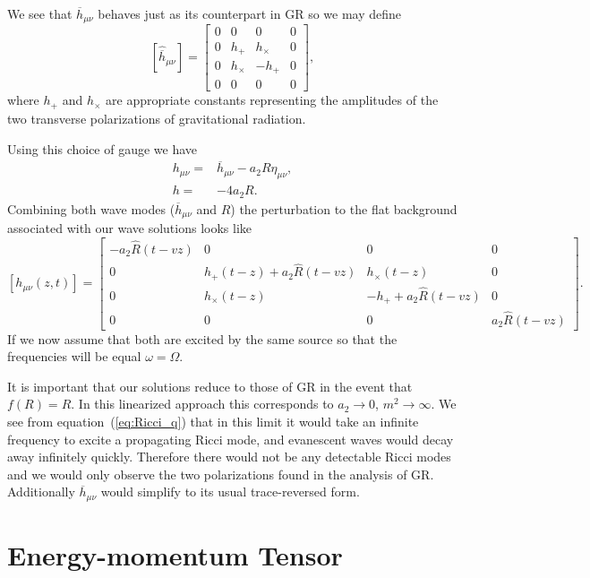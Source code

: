 \documentclass[a4paper, 11pt, titlepage, twoside]{report}
\newcommand{\eqnref}[1]{equation~(\ref{eq:#1})}
\begin{document}
We see that $\overline{h}_{\mu\nu}$ behaves just as its counterpart in GR so we may define
\begin{equation}
\left[\hat{\overline{h}}_{\mu\nu}\right] =
\begin{bmatrix}
0 & 0 & 0 & 0\\
0 & h_+ & h_\times & 0\\
0 & h_\times & -h_+ & 0\\
0 & 0 & 0 & 0
\end{bmatrix},
\end{equation}
where $h_+$ and $h_\times$ are appropriate constants representing the amplitudes of the two transverse polarizations of gravitational radiation.

Using this choice of gauge we have
\begin{align}
h_{\mu\nu} = {} & \overline{h}_{\mu\nu} - a_2 R\eta_{\mu\nu},\\
h = {} & -4a_2R.
\label{eq:gauge}
\end{align}
Combining both wave modes ($\overline{h}_{\mu\nu}$ and $R$) the perturbation to the flat background associated with our wave solutions looks like
\begin{equation}
\left[{h}_{\mu\nu}(z,t)\right] =
\begin{bmatrix}
-a_2\hat{R}(t - vz) & 0 & 0 & 0\\
0 & h_+(t - z) + a_2\hat{R}(t - vz) & h_\times(t - z) & 0\\
0 & h_\times(t - z) & -h_+ + a_2\hat{R}(t - vz) & 0\\
0 & 0 & 0 & a_2\hat{R}(t - vz)
\end{bmatrix}.
\end{equation}
If we now assume that both are excited by the same source so that the frequencies will be equal $\omega = \Omega$.

It is important that our solutions reduce to those of GR in the event that $f(R) = R$. In this linearized approach this corresponds to $a_2 \rightarrow 0$, $m^2 \rightarrow \infty$. We see from \eqnref{Ricci_q} that in this limit it would take an infinite frequency to excite a propagating Ricci mode, and evanescent waves would decay away infinitely quickly. Therefore there would not be any detectable Ricci modes and we would only observe the two polarizations found in the analysis of GR. Additionally $\overline{h}_{\mu\nu}$ would simplify to its usual trace-reversed form.

\section{Energy-momentum Tensor}
\end{document}

